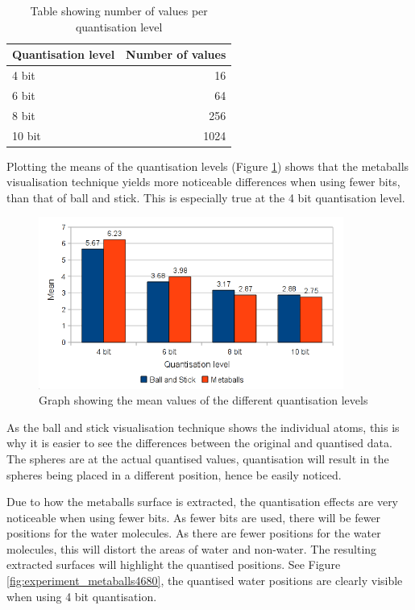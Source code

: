 \begin{table}[h!]
  \begin{tabular}{ | l | r | }
  \hline
  Quantisation level & Number of values  \\ \hline
  4 bit              &               16  \\ \hline
  6 bit              &               64  \\ \hline
  8 bit              &              256  \\ \hline
  10 bit             &             1024  \\ \hline
  \end{tabular}
  \caption{Table showing number of values per quantisation level}
  \label{tab:experiment_bitvalues}
\end{table}

Plotting the means of the quantisation levels (Figure
\ref{fig:experiment_bm_means}) shows that the metaballs visualisation technique
yields more noticeable differences when using fewer bits, than that of ball and
stick. This is especially true at the 4 bit quantisation level.

\begin{figure}[h!]
  \begin{center}
    \includegraphics[width=100mm]{bm_means}
  \end{center}
  \caption{Graph showing the mean values of the different quantisation levels}
  \label{fig:experiment_bm_means}
\end{figure}

As the ball and stick visualisation technique shows the individual atoms, this
is why it is easier to see the differences between the original and quantised
data. The spheres are at the actual quantised values, quantisation will result
in the spheres being placed in a different position, hence be easily noticed.

Due to how the metaballs surface is extracted, the quantisation effects are
very noticeable when using fewer bits. As fewer bits are used, there will be
fewer positions for the water molecules. As there are fewer positions for the
water molecules, this will distort the areas of water and non-water. The
resulting extracted surfaces will highlight the quantised positions. See Figure
\ref{fig:experiment_metaballs4680}, the quantised water positions are clearly
visible when using 4 bit quantisation.

